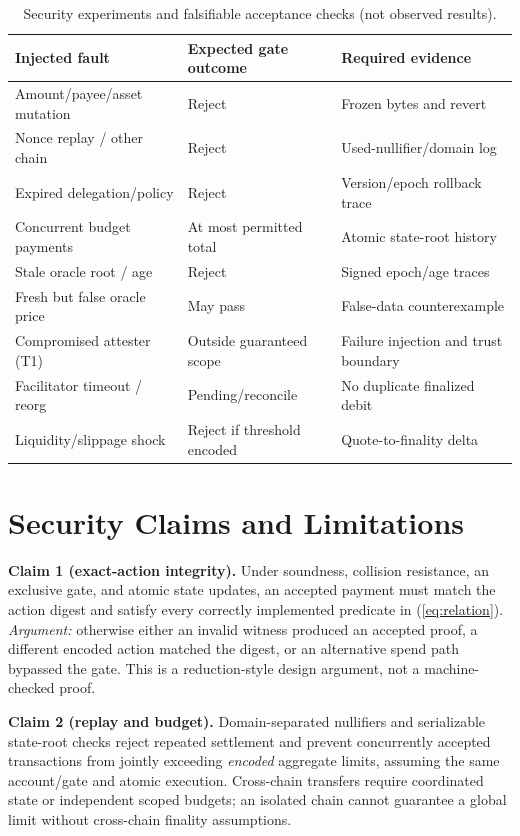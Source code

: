 \documentclass[conference]{IEEEtran}
\begin{document}
\begin{table}[t]
\caption{Security experiments and falsifiable acceptance checks (not observed results).}
\label{tab:attacks}
\centering\footnotesize
\setlength{\tabcolsep}{3pt}
\begin{tabularx}{\columnwidth}{@{}p{}XX@{}}
\toprule
Injected fault & Expected gate outcome & Required evidence \\
\midrule
Amount/payee/asset mutation & Reject & Frozen bytes and revert \\
Nonce replay / other chain & Reject & Used-nullifier/domain log \\
Expired delegation/policy & Reject & Version/epoch rollback trace \\
Concurrent budget payments & At most permitted total & Atomic state-root history \\
Stale oracle root / age & Reject & Signed epoch/age traces \\
Fresh but false oracle price & May pass & False-data counterexample \\
Compromised attester (T1) & Outside guaranteed scope & Failure injection and trust boundary \\
Facilitator timeout / reorg & Pending/reconcile & No duplicate finalized debit \\
Liquidity/slippage shock & Reject if threshold encoded & Quote-to-finality delta \\
\bottomrule
\end{tabularx}
\end{table}

\section{Security Claims and Limitations}
\textbf{Claim 1 (exact-action integrity).} Under soundness, collision resistance, an exclusive gate, and atomic state updates, an accepted payment must match the action digest and satisfy every correctly implemented predicate in (\ref{eq:relation}). \emph{Argument:} otherwise either an invalid witness produced an accepted proof, a different encoded action matched the digest, or an alternative spend path bypassed the gate. This is a reduction-style design argument, not a machine-checked proof.

\textbf{Claim 2 (replay and budget).} Domain-separated nullifiers and serializable state-root checks reject repeated settlement and prevent concurrently accepted transactions from jointly exceeding \emph{encoded} aggregate limits, assuming the same account/gate and atomic execution. Cross-chain transfers require coordinated state or independent scoped budgets; an isolated chain cannot guarantee a global limit without cross-chain finality assumptions.
\end{document}
